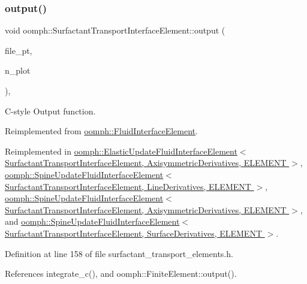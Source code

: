 \subsubsection{\texorpdfstring{output()}{output()}\hspace{0.1cm}{\footnotesize\ttfamily [4/4]}}
{\footnotesize\ttfamily void oomph\+::\+Surfactant\+Transport\+Interface\+Element\+::output (\begin{DoxyParamCaption}\item[{F\+I\+LE $\ast$}]{file\+\_\+pt,  }\item[{const unsigned \&}]{n\+\_\+plot }\end{DoxyParamCaption})\hspace{0.3cm}{\ttfamily [inline]}, {\ttfamily [virtual]}}



C-\/style Output function. 



Reimplemented from \hyperlink{classoomph_1_1FluidInterfaceElement_a57efd66ae07fab9e0cf98ac5f8eeb000}{oomph\+::\+Fluid\+Interface\+Element}.



Reimplemented in \hyperlink{classoomph_1_1ElasticUpdateFluidInterfaceElement_a10b64a463b5ff98475e727b06d95b0ac}{oomph\+::\+Elastic\+Update\+Fluid\+Interface\+Element$<$ Surfactant\+Transport\+Interface\+Element, Axisymmetric\+Derivatives, E\+L\+E\+M\+E\+N\+T $>$}, \hyperlink{classoomph_1_1SpineUpdateFluidInterfaceElement_af876d90d19b6faa253260193ded3f175}{oomph\+::\+Spine\+Update\+Fluid\+Interface\+Element$<$ Surfactant\+Transport\+Interface\+Element, Line\+Derivatives, E\+L\+E\+M\+E\+N\+T $>$}, \hyperlink{classoomph_1_1SpineUpdateFluidInterfaceElement_af876d90d19b6faa253260193ded3f175}{oomph\+::\+Spine\+Update\+Fluid\+Interface\+Element$<$ Surfactant\+Transport\+Interface\+Element, Axisymmetric\+Derivatives, E\+L\+E\+M\+E\+N\+T $>$}, and \hyperlink{classoomph_1_1SpineUpdateFluidInterfaceElement_af876d90d19b6faa253260193ded3f175}{oomph\+::\+Spine\+Update\+Fluid\+Interface\+Element$<$ Surfactant\+Transport\+Interface\+Element, Surface\+Derivatives, E\+L\+E\+M\+E\+N\+T $>$}.



Definition at line 158 of file surfactant\+\_\+transport\+\_\+elements.\+h.



References integrate\+\_\+c(), and oomph\+::\+Finite\+Element\+::output().

\mbox{\label{classoomph_1_1SurfactantTransportInterfaceElement_ac945c28401b92a061e3e245e83541c55}} 
